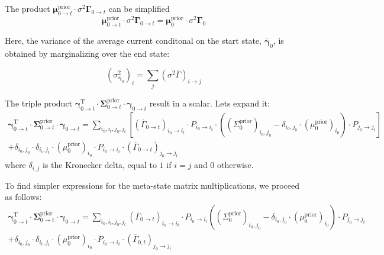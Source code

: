 \documentclass[pdflatex,sn-mathphys-num]{sn-jnl}%
\theoremstyle{thmstyleone}%
\theoremstyle{thmstyletwo}%
\theoremstyle{thmstylethree}%
\begin{document}
The product $\mathbf{\mu}^{\mathrm{prior}}_{0 \rightarrow t} \cdot {\sigma^2 \mathbf{\Gamma}}_{0 \rightarrow t}$ can be simplified
\begin{equation}
	\mathbf{\mu}^{\mathrm{prior}}_{0 \rightarrow t} \cdot {\sigma^2 \mathbf{\Gamma}}_{0 \rightarrow t}= \mathbf{\mu}^{\mathrm{prior}}_{0} \cdot {\sigma^2 \mathbf{\Gamma}}_{0}
	\label{eq:meta_channel_noise}
\end{equation}
 
Here, the variance of the average current conditonal on the start state, \( \overline{\mathbf{\gamma}}_{0} \), is obtained by marginalizing over the end state:

\begin{equation}
	(\sigma^2_{\overline{\mathbf{\gamma}}_{0}})_i = \sum_j (\sigma^2 \overline{\Gamma})_{i \rightarrow j}
	\label{eq:sigma_gamma_i}
\end{equation}


The triple product $\mathbf{\gamma}^{\mathrm{T}}_{0 \rightarrow t} \cdot \mathbf{\Sigma}^{\mathrm{prior}}_{0 \rightarrow t} \cdot \mathbf{\gamma}_{0 \rightarrow t}$ result in a scalar. Lets expand it:
\begin{multline}
	\mathbf{\gamma}^{\mathrm{T}}_{0 \rightarrow t} \cdot \mathbf{\Sigma}^{\mathrm{prior}}_{0 \rightarrow t} \cdot \mathbf{\gamma}_{0 \rightarrow t} = 
	\sum_{i_0, i_t, j_0, j_t} 
	\left[ (\overline{\Gamma}_{0 \rightarrow t})_{i_0 \rightarrow i_t} \cdot P_{i_0 \rightarrow i_t} \cdot \left( (\Sigma^{\mathrm{prior}}_{0})_{i_0, j_0} - \delta_{i_0, j_0} \cdot (\mu^{\mathrm{prior}}_0)_{i_0} \right) \cdot P_{j_0 \rightarrow j_t} \right] \\
	+ \delta_{i_0, j_0} \cdot \delta_{i_t, j_t} \cdot (\mu^{\mathrm{prior}}_0)_{i_0} \cdot P_{i_0 \rightarrow i_t} \cdot (\overline{\Gamma}_{0 \rightarrow t})_{j_0 \rightarrow j_t}
	\label{eq:meta_state_cov_mult}
\end{multline}
where $\delta_{i, j}$ is the Kronecker delta, equal to $1$ if $i = j$ and $0$ otherwise.

To find simpler expressions for the meta-state matrix multiplications, we proceed as follows:
\begin{multline}
	\mathbf{\gamma}^{\mathrm{T}}_{0 \rightarrow t} \cdot \mathbf{\Sigma}^{\mathrm{prior}}_{0 \rightarrow t} \cdot \mathbf{\gamma}_{0 \rightarrow t} = 
	\sum_{i_0, i_t, j_0, j_t}
	(\overline{\Gamma}_{0 \rightarrow t})_{i_0 \rightarrow i_t} \cdot 
	P_{i_0 \rightarrow i_t} \left((\Sigma^{\mathrm{prior}}_{0})_{i_0, j_0} - \delta_{i_0, j_0} \cdot (\mu^{\mathrm{prior}}_0)_{i_0} \right)  \cdot P_{j_0 \rightarrow j_t} \\
	+ \delta_{i_0, j_0} \cdot \delta_{i_t, j_t} \cdot (\mu^{\mathrm{prior}}_0)_{i_0} \cdot P_{i_0 \rightarrow i_t} 
	\cdot (\overline{\Gamma}_{0, t})_{j_0 \rightarrow j_t}
	\label{eq:meta_state_expansion}
\end{multline}
\end{document}

